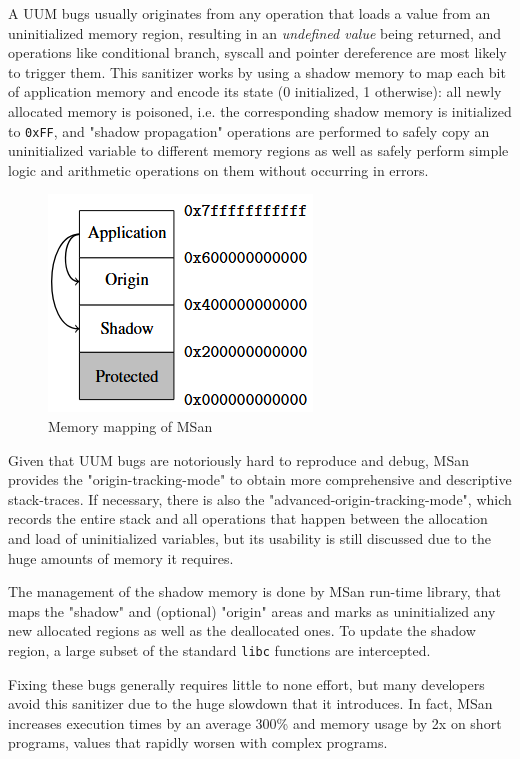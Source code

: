 A UUM bugs usually originates from any operation that loads a value from an uninitialized memory region, resulting in an \textit{undefined value} being returned, and operations like conditional branch, syscall and pointer dereference are most likely to trigger them. This sanitizer works by using a shadow memory to map each bit of application memory and encode its state (0 initialized, 1 otherwise): all newly allocated memory is poisoned, i.e. the corresponding shadow memory is initialized to \verb|0xFF|, and "shadow propagation" operations are performed to safely copy an uninitialized variable to different memory regions as well as safely perform simple logic and arithmetic operations on them without occurring in errors.

\begin{figure}[h]
\centering
\includegraphics[scale=0.68]{foto/shadow_memory_2.png}
\caption{Memory mapping of MSan \cite{stepanov2015memorysanitizer}}
\label{fig:msan_shadow}
\end{figure}

Given that UUM bugs are notoriously hard to reproduce and debug, MSan provides the "origin-tracking-mode" to obtain more comprehensive and descriptive stack-traces. If necessary, there is also the "advanced-origin-tracking-mode", which records the entire stack and all operations that happen between the allocation and load of uninitialized variables, but its usability is still discussed due to the huge amounts of memory it requires.

The management of the shadow memory is done by MSan run-time library, that maps the "shadow" and (optional) "origin" areas and marks as uninitialized any new allocated regions as well as the deallocated ones. To update the shadow region, a large subset of the standard \verb|libc| functions are intercepted.

Fixing these bugs generally requires little to none effort, but many developers avoid this sanitizer due to the huge slowdown that it introduces. In fact, MSan increases execution times by an average 300\% and memory usage by 2x on short programs, values that rapidly worsen with complex programs. \cite{stepanov2015memorysanitizer}

